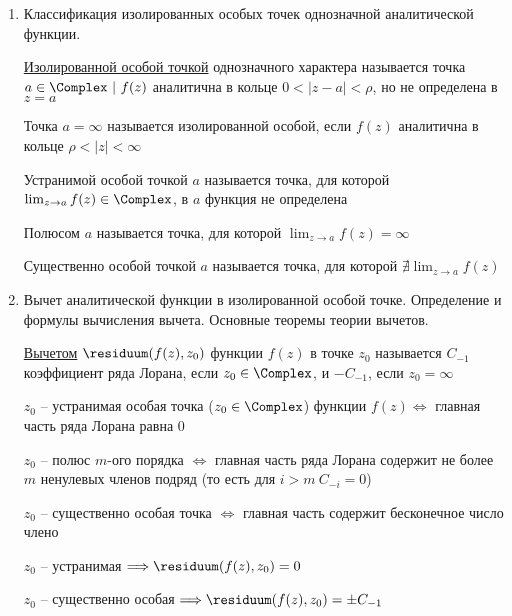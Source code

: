 \begin{enumerate}
    \item Классификация изолированных особых точек однозначной аналитической функции.

    \Def \hyperlink{isolated_special_point}{Изолированной особой точкой} однозначного характера называется точка $a \in \Complex \ | \ f(z)$ аналитична в кольце $0 < |z - a| < \rho$, но не определена в $z = a$

    \Defs Точка $a = \infty$ называется изолированной особой, если $f(z)$ аналитична в кольце $\rho < |z| < \infty$

    \Defs Устранимой особой точкой $a$ называется точка, для которой $\lim_{z \to a} f(z) \in \Complex$, в $a$ функция не определена

    Полюсом $a$ называется точка, для которой $\lim_{z \to a} f(z) = \infty$

    Существенно особой точкой $a$ называется точка, для которой $\nexists \lim_{z \to a} f(z)$

    \item Вычет аналитической функции в изолированной особой точке. Определение и формулы вычисления вычета. Основные теоремы теории вычетов.

    \Defs \hyperlink{residuum}{Вычетом} $\residuum(f(z), z_0)$ функции $f(z)$ в точке $z_0$ называется $C_{-1}$ коэффициент ряда Лорана, если $z_0 \in \Complex$, и $-C_{-1}$, если $z_0 = \infty$

    \begin{MyTheorem}
         $z_0$ -- устранимая особая точка ($z_0 \in \Complex$) функции $f(z) \Longleftrightarrow$ главная часть ряда Лорана равна 0
    \end{MyTheorem}
    
    \begin{MyTheorem}
         $z_0$ -- полюс $m$-ого порядка $\Longleftrightarrow$ главная часть ряда Лорана содержит не более $m$ ненулевых членов подряд (то есть для $i > m \ C_{-i} = 0$) 
    \end{MyTheorem}

    \begin{MyTheorem}
         $z_0$ -- существенно особая точка $\Longleftrightarrow$ главная часть содержит бесконечное число члено
    \end{MyTheorem}

    \Notas $z_0$ -- устранимая $\Longrightarrow \residuum(f(z), z_0) = 0$
    
    $z_0$ -- существенно особая $\Longrightarrow \residuum(f(z), z_0) = \pm C_{-1}$
    

\end{enumerate}
